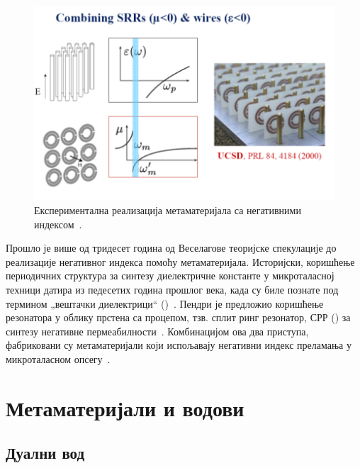 \documentclass[main.tex]{subfiles}
\begin{document}
\begin{figure}[h]
    \centering
    \includegraphics[width=0.8\linewidth]{sl_uvod/zice_srr_branka.png}
    \caption{Експериментална реализација метаматеријала са негативними индексом~\cite{smith:00}.}
    \label{uvod:mm_smit}
\end{figure}
Прошло је више од тридесет година од Веселагове теоријске спекулације до реализације негативног индекса помоћу метаматеријала. Историјски, коришћење периодичних структура за синтезу диелектричне константе у микроталасној техници датира из педесетих година прошлог века, када су биле познате под термином „вештачки диелектрици`` ()~\cite{rotman1962plasma}. Пендри је предложио коришћење резонатора у облику прстена са процепом, тзв. сплит ринг резонатор, СРР () за синтезу негативне пермеабилности~\cite{pendri:99}. Комбинацијом ова два приступа, фабриковани су метаматеријали који испољавају негативни индекс преламања у микроталасном опсегу~\cite{smith:00}.
%

\section{Метаматеријали и водови}

\subsection{Дуални вод}
\end{document}
